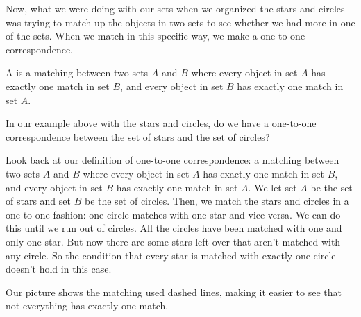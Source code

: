 \documentclass{ximera}
\begin{document}
Now, what we were doing with our sets when we organized the stars and circles was trying to match up the objects in two sets to see whether we had more in one of the sets. When we match in this specific way, we make a one-to-one correspondence.

\begin{definition}
	A  is a matching between two sets $A$ and $B$ where every object in set $A$ has exactly one match in set $B$, and every object in set $B$ has exactly one match in set $A$.
\end{definition}

\begin{question}
In our example above with the stars and circles, do we have a one-to-one correspondence between the set of stars and the set of circles?
\begin{center}
\end{center}
\begin{multipleChoice}
\end{multipleChoice}
\begin{explanation}
	Look back at our definition of one-to-one correspondence: a matching between two sets $A$ and $B$ where every object in set $A$ has exactly one match in set $B$, and every object in set $B$ has exactly one match in set $A$. We let set $A$ be the set of stars and set $B$ be the set of circles. Then, we match the stars and circles in a one-to-one fashion: one circle matches with one star and vice versa. We can do this until we run out of circles. All the circles have been matched with one and only one star. But now there are some stars left over that aren't matched with any circle. So the condition that every star is matched with exactly one circle doesn't hold in this case.
\begin{center}
\end{center}
Our picture shows the matching used dashed lines, making it easier to see that not everything has exactly one match.
\end{explanation}
\end{question}
\end{document}

